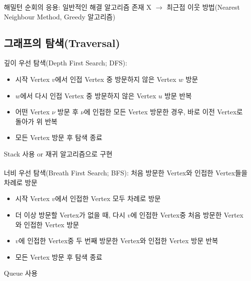 \newpage
해밀턴 순회의 응용: 일반적인 해결 알고리즘 존재 X $\to$ 최근접 이웃 방법(Nearest Neighbour Method, Greedy 알고리즘)

\subsection{그래프의 탐색(Traversal)}
깊이 우선 탐색(Depth First Search; DFS):
\begin{itemize}
    \item 시작 Vertex $v$에서 인접 Vertex 중 방문하지 않은 Vertex $w$ 방문
    \item $w$에서 다시 인접 Vertex 중 방문하지 않은 Vertex $u$ 방문 반복
    \item 어떤 Vertex $\nu$ 방문 후 $\nu$에 인접한 모든 Vertex 방문한 경우, 바로 이전 Vertex로 돌아가 위 반복
    \item 모든 Vertex 방문 후 탐색 종료
\end{itemize}

Stack 사용 or 재귀 알고리즘으로 구현\\\\
너비 우선 탐색(Breath First Search; BFS): 처음 방문한 Vertex와 인접한 Vertex들을 차례로 방문
\begin{itemize}
    \item 시작 Vertex $v$에서 인접한 Vertex 모두 차례로 방문
    \item 더 이상 방문할 Vertex가 없을 때, 다시 $v$에 인접한 Vertex중 처음 방문한 Vertex와 인접한 Vertex 방문
    \item $v$에 인접한 Vertex중 두 번째 방문한 Vertex와 인접한 Vertex 방문 반복
    \item 모든 Vertex 방문 후 탐색 종료
\end{itemize}

Queue 사용

